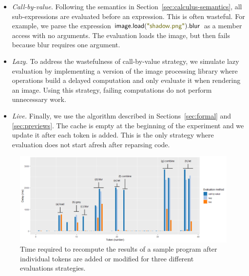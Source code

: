 \documentclass[english,crc]{programming}
\theoremstyle{plain}
\theoremstyle{definition}
\newcommand{\str}[1]{\textnormal{\textcolor{strclr}{\sffamily "#1"}}}
\newcommand{\ident}[1]{\textnormal{\textcolor{idclr}{\sffamily #1}}}
\begin{document}
\begin{itemize}
\item \emph{Call-by-value.} Following the semantics in Section~\ref{sec:calculus-semantics},
  all sub-expressions are evaluated before an expression. This is often wasteful. For example,
  we parse the expression $\ident{image}.\ident{load}(\str{shadow.png}).\ident{blur}$ as a member access with no
  arguments. The evaluation loads the image, but then fails because blur requires one argument.

\item \emph{Lazy.} To address the wastefulness of call-by-value strategy, we
  simulate lazy evaluation by implementing a version of the image processing library where
  operations build a delayed computation and only evaluate it when rendering an image. Using
  this strategy, failing computations do not perform unnecessary work.

\item \emph{Live.} Finally, we use the algorithm described in
  Sections~\ref{sec:formal} and \ref{sec:previews}. The cache is empty at the beginning of the
  experiment and we update it after each token is added. This is the only strategy where
  evaluation does not start afresh after reparsing code.
\end{itemize}


\begin{figure}[t]
\vspace{-0.5em}
\includegraphics[scale=0.425]{figures/drawing.png}
\caption{Time required to recompute the results of a sample program after individual tokens
  are added or modified for three different evaluations strategies.}
\label{fig:drawing}
\vspace{-0.5em}
\end{figure}

\end{document}
